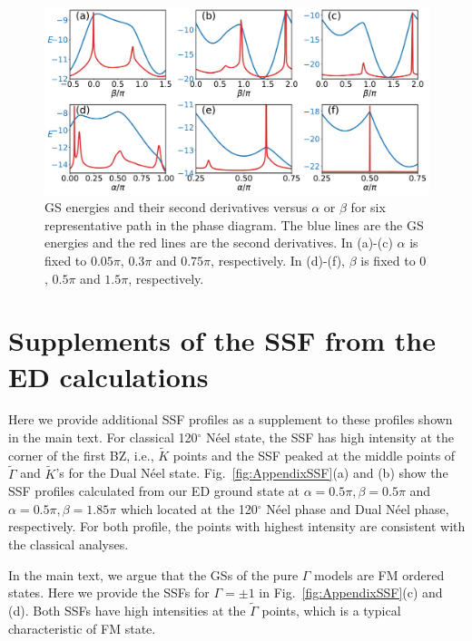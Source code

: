 \documentclass[aps,prb,reprint,amsfonts,amsmath,amssymb,showpacs,groupedaddress,superscriptaddress]{revtex4-1}
\begin{document}
\begin{figure}
    \centering
    \includegraphics[width=\columnwidth]{fig/SecondDerivatives.pdf}
    \caption{\label{fig:SecondDerivatives} GS energies and their second derivatives versus $\alpha$ or $\beta$ for six representative path in the phase diagram. The blue lines are the GS energies and the red lines are the second derivatives. In (a)-(c) $\alpha$ is fixed to $0.05\pi$, $0.3\pi$ and $0.75\pi$, respectively. In (d)-(f), $\beta$ is fixed to $0$, $0.5\pi$ and $1.5\pi$, respectively.}
\end{figure}

\section{\label{apx:SSF}Supplements of the SSF from the ED calculations}

Here we provide additional SSF profiles as a supplement to these profiles shown in the main text. For classical 120$^\circ$ N\'{e}el state, the SSF has high intensity at the corner of the first BZ, i.e., $\tilde{K}$ points and the SSF peaked at the middle points of $\tilde{\Gamma}$ and $\tilde{K}$'s for the Dual N\'{e}el state. Fig.~\ref{fig:AppendixSSF}(a) and (b) show the SSF profiles calculated from our ED ground state at $\alpha=0.5\pi, \beta=0.5\pi$ and $\alpha=0.5\pi, \beta=1.85\pi$ which located at the 120$^\circ$ N\'{e}el phase and Dual N\'{e}el phase, respectively. For both profile, the points with highest intensity are consistent with the classical analyses.

In the main text, we argue that the GSs of the pure $\Gamma$ models are FM ordered states. Here we provide the SSFs for $\Gamma = \pm 1$ in Fig.~\ref{fig:AppendixSSF}(c) and (d). Both SSFs have high intensities at the $\tilde{\Gamma}$ points, which is a typical characteristic of FM state.
\end{document}
